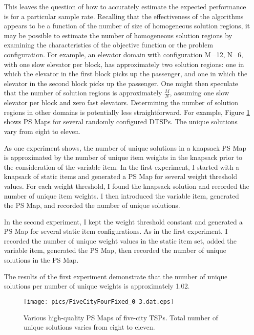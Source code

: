 
This leaves the question of how to accurately estimate the expected performance is for a particular sample rate. Recalling that the effectiveness of the algorithms appears to be a function of the number of size of homogeneous solution regions, it may be possible to estimate the number of homogeneous solution regions by examining the  characteristics of the objective function or the problem configuration.  For example, an elevator domain with configuration M=12, N=6, with one slow elevator per block, has approximately two solution regions:  one in which the elevator in the first block picks up the passenger, and one in which the elevator in the second block picks up the passenger.  One might then speculate that the  number of solution regions is approximately $\frac{M}{N}$, assuming one slow elevator per block and zero fast elevators.  Determining the number of solution regions in other domains is potentially less straightforward.  For example, Figure \ref{fig:five_city_tsps} shows PS Maps for several randomly configured DTSPs.  The unique solutions vary from eight to eleven.


As one experiment shows, the number of unique solutions in a knapsack PS Map is approximated by the number of unique item weights in the knapsack prior to the consideration of the variable item.  In the first experiment, I started with a knapsack of static items and generated a PS Map for several weight threshold values.  For each weight threshold, I found the knapsack solution and recorded the number of unique item weights.  I then introduced the variable item, generated the PS Map, and recorded the number of unique solutions.

In the second experiment, I kept the weight threshold constant and generated a PS Map for several static item  configurations.  As in the first experiment, I recorded the number of unique weight values in the static item set, added the variable item, generated the PS Map, then recorded the number of unique solutions in the PS Map.

The results of the first experiment demonstrate that the number of unique solutions per number of unique weights is approximately 1.02.




\begin{figure}
\begin{center}
\texttt{[image: pics/FiveCityFourFixed\_0-3.dat.eps]}
\caption{Various high-quality PS Maps of five-city TSPs.  Total number of unique solutions varies from eight to eleven.}
\label{fig:five_city_tsps}
\end{center}
\end{figure}


